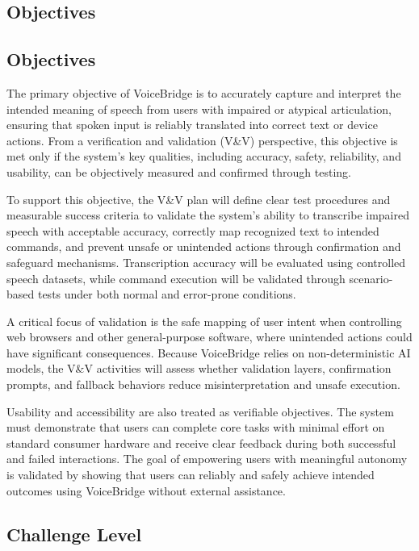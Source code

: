 \documentclass[12pt, titlepage]{article}
\begin{document}
\subsection{Objectives}

\subsection{Objectives}

The primary objective of VoiceBridge is to accurately capture and interpret the intended meaning of speech from users with impaired or atypical articulation, ensuring that spoken input is reliably translated into correct text or device actions. From a verification and validation (V\&V) perspective, this objective is met only if the system’s key qualities, including accuracy, safety, reliability, and usability, can be objectively measured and confirmed through testing.

To support this objective, the V\&V plan will define clear test procedures and measurable success criteria to validate the system’s ability to transcribe impaired speech with acceptable accuracy, correctly map recognized text to intended commands, and prevent unsafe or unintended actions through confirmation and safeguard mechanisms. Transcription accuracy will be evaluated using controlled speech datasets, while command execution will be validated through scenario-based tests under both normal and error-prone conditions.

A critical focus of validation is the safe mapping of user intent when controlling web browsers and other general-purpose software, where unintended actions could have significant consequences. Because VoiceBridge relies on non-deterministic AI models, the V\&V activities will assess whether validation layers, confirmation prompts, and fallback behaviors reduce misinterpretation and unsafe execution.

Usability and accessibility are also treated as verifiable objectives. The system must demonstrate that users can complete core tasks with minimal effort on standard consumer hardware and receive clear feedback during both successful and failed interactions. The goal of empowering users with meaningful autonomy is validated by showing that users can reliably and safely achieve intended outcomes using VoiceBridge without external assistance.

\subsection{Challenge Level}
\end{document}
